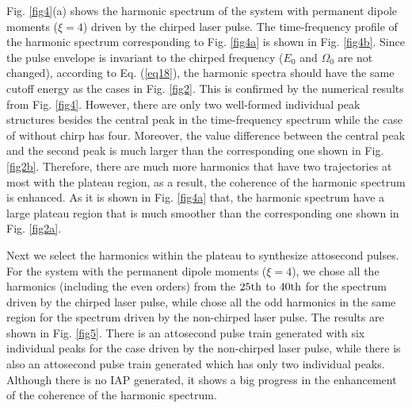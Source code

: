 \documentclass[10pt,letterpaper]{article}
\begin{document}
Fig. \ref{fig4}(a) shows the harmonic spectrum of the system with permanent dipole moments ($ \xi=4 $) driven by the chirped laser pulse. The time-frequency profile of the harmonic spectrum corresponding to Fig. \ref{fig4a} is shown in Fig. \ref{fig4b}. Since the pulse envelope is invariant to the chirped frequency ($ E_{0} $ and $ \Omega_{0} $ are not changed), according to Eq. (\ref{eq18}), the harmonic spectra should have the same cutoff energy as the cases in Fig. \ref{fig2}. This is confirmed by the numerical results from Fig. \ref{fig4}. However, there are only two well-formed individual peak structures besides the central peak in the time-frequency spectrum while the case of without chirp has four. Moreover, the value difference between the central peak and the second peak is much larger than the corresponding one shown in Fig. \ref{fig2b}. Therefore, there are much more harmonics that have two trajectories at most with the plateau region, as a result, the coherence of the harmonic spectrum is enhanced. As it is shown in Fig. \ref{fig4a} that, the harmonic spectrum have a large plateau region that is much smoother than the corresponding one shown in Fig. \ref{fig2a}. 

Next we select the harmonics within the plateau to synthesize attosecond pulses. For the system with the permanent dipole moments ($ \xi=4 $), we chose all the harmonics (including the even orders) from the $ 25\rm{th} $ to $ 40\rm{th} $ for the spectrum driven by the chirped laser pulse, while chose all the odd harmonics in the same region for the spectrum driven by the non-chirped laser pulse. The results are shown in Fig. \ref{fig5}. There is an attosecond pulse train generated with six individual peaks for the case driven by the non-chirped laser pulse, while there is also an attosecond pulse train generated which has only two individual peaks. Although there is no IAP generated, it shows a big progress in the enhancement of the coherence of the harmonic spectrum. 
\end{document}
